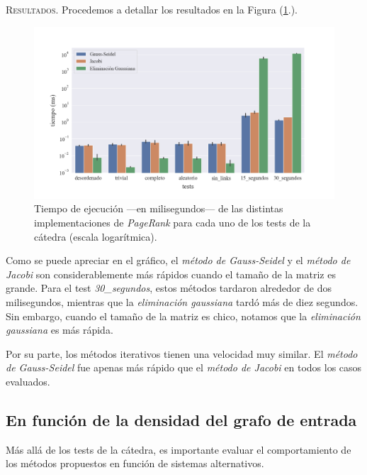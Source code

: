 \vspace{1.5em}
\noindent \textsc{Resultados}. Procedemos a detallar los resultados en la Figura (\ref{tiempo_ej}.). 

\begin{figure}[!htbp]
    \centering
    \includegraphics[width=.9\textwidth, trim=0 30 0 30]{files/src/.media/tiempo-ejecucion.png}
    \caption{Tiempo de ejecución ---en milisegundos--- de las distintas implementaciones de \textit{PageRank} para cada uno de los tests de la cátedra (escala logarítmica).} \label{tiempo_ej}
\end{figure}


\vspace{1em}
Como se puede apreciar en el gráfico, el \textit{método de Gauss-Seidel} y el \textit{método de Jacobi} son considerablemente más rápidos cuando el tamaño de la matriz es grande. Para el test \textit{30\_segundos}, estos métodos tardaron alrededor de dos milisegundos, mientras que la \textit{eliminación gaussiana} tardó más de diez segundos. Sin embargo, cuando el tamaño de la matriz es chico, notamos que la \textit{eliminación gaussiana} es más rápida. 

\vspace{1em}
Por su parte, los métodos iterativos tienen una velocidad muy similar. El \textit{método de Gauss-Seidel} fue apenas más rápido que el \textit{método de Jacobi} en todos los casos evaluados.





\vspace{2em}
\subsection{En función de la densidad del grafo de entrada}

Más allá de los tests de la cátedra, es importante evaluar el comportamiento de los métodos propuestos en función de sistemas alternativos.

